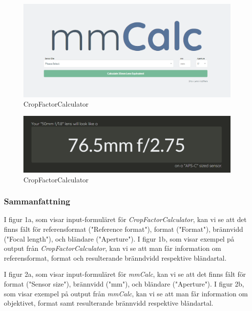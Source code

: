 \documentclass[11pt]{article}
\begin{document}
\begin{subfigures}

\begin{figure}[!htb]
\caption{CropFactorCalculator}
\includegraphics[width=\textwidth]{mmcalc-in}
\end{figure}

\begin{figure}[!ht]
\caption{CropFactorCalculator}
\includegraphics[width=\textwidth]{mmcalc-out}
\end{figure}

\end{subfigures}

\clearpage

\subsubsection{Sammanfattning}
\sloppy
I figur 1a, som visar input-formuläret för \emph{CropFactorCalculator}, kan vi
se att det finns fält för referensformat ("Reference format"), format
("Format"), brännvidd ("Focal length"), och bländare ("Aperture"). I figur 1b,
som visar exempel på output från \emph{CropFactorCalculator}, kan vi se att man
får information om referensformat, format och resulterande bränndvidd respektive
bländartal.\par

I figur 2a, som visar input-formuläret för \emph{mmCalc}, kan vi se att det
finns fält för format ("Sensor size"), brännvidd ("mm"), och bländare
("Aperture"). I figur 2b, som visar exempel på output från \emph{mmCalc}, kan vi
se att man får information om objektivet, format samt resulterande brännvidd
respektive bländartal.\par
\fussy
\end{document}
